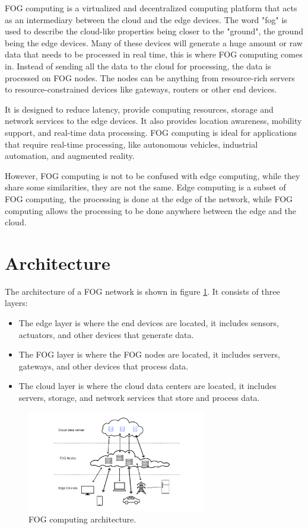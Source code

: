 FOG computing is a virtualized and decentralized computing platform that acts as an intermediary between the cloud and
the edge devices. The word "fog" is used to describe the cloud-like properties being closer to the "ground", the ground
being the edge devices. Many of these devices will generate a huge amount or raw data that needs to be processed in real
time, this is where FOG computing comes in. Instead of sending all the data to the cloud for processing, the data is
processed on FOG nodes. The nodes can be anything from resource-rich servers to resource-constrained devices like
gateways, routers or other end devices.

It is designed to reduce latency, provide computing resources, storage and network services to the edge devices. It also
provides location awareness, mobility support, and real-time data processing. FOG computing is ideal for applications that
require real-time processing, like autonomous vehicles, industrial automation, and augmented reality.

However, FOG computing is not to be confused with edge computing, while they share some similarities, they are not the
same. Edge computing is a subset of FOG computing, the processing is done at the edge of the network, while FOG computing
allows the processing to be done anywhere between the edge and the cloud.

\section{Architecture}
\label{sec:fog-architecture}

The architecture of a FOG network is shown in figure \ref{fig:fog-architecture}. It consists of three layers:
\begin{itemize}
  \item The edge layer is where the end devices are located, it includes sensors, actuators, and other devices that
        generate data.
  \item The FOG layer is where the FOG nodes are located, it includes servers, gateways, and other devices that
        process data.
  \item The cloud layer is where the cloud data centers are located, it includes servers, storage, and network
        services that store and process data.
\end{itemize}

\begin{figure}[H]
  \centering
  \includegraphics[width=0.70\textwidth]{../images/FOG_network_ink.png}
  \caption{FOG computing architecture.}
  \label{fig:fog-architecture}
\end{figure}

